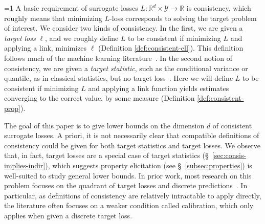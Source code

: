 \documentclass[anon,12pt]{colt2021} %
\newcommand{\Comments}{1}
\newcommand{\mynote}[2]{\ifnum\Comments=1\textcolor{#1}{#2}\fi}
\newcommand{\mytodo}[2]{\ifnum\Comments=1%
	\todo[linecolor=#1!80!black,backgroundcolor=#1,bordercolor=#1!80!black]{#2}\fi}
\newcommand{\jessie}[1]{\mynote{purple}{[JF: #1]}}
\newcommand{\jessiet}[1]{\mytodo{purple!20!white}{JF: #1}}
\newcommand{\bo}[1]{\mynote{blue}{[Bo: #1]}}
\newcommand{\reals}{\mathbb{R}}
\newcommand{\Y}{\mathcal{Y}}
\begin{document}
\jessiet{Make this subsection more concise?}
A basic requirement of surrogate losses $L: \reals^d \times \Y \to \reals$ is consistency, which roughly means that minimizing $L$-loss corresponds to solving the target problem of interest.
We consider two kinds of consistency.
In the first, we are given a \emph{target loss} $\ell$, and we roughly define $L$ to be consistent if minimizing $L$ and applying a link, minimizes $\ell$ (Definition \ref{def:consistent-ell}).
This definition follows much of the machine learning literature~\citep{zhang2004statistical,bartlett2006convexity,tewari2007consistency,steinwart2007compare,ramaswamy2016convex}.
In the second notion of consistency, we are given a \emph{target statistic}, such as the conditional variance or quantile, as in classical statistics, but no target loss~\citep{gyorfi2006distribution, fan1998efficient,ruppert1997local}.
Here we will define $L$ to be consistent if minimizing $L$ and applying a link function yields estimates converging to the correct value, by some measure (Definition \ref{def:consistent-prop}).


The goal of this paper is to give lower bounds on the dimension $d$ of consistent surrogate losses.
A priori, it is not necessarily clear that compatible definitions of consistency could be given for both target statistics and target losses.
We observe that, in fact, target losses are a special case of target statistics (\S~\ref{sec:consis-implies-indir}),
which suggests property elicitation (see \S~\ref{subsec:properties}) is well-suited to study general lower bounds.
In prior work, most research on this problem focuses on the quadrant of target losses and discrete predictions~\citep{zhang2004statistical,bartlett2006convexity,tewari2007consistency,ramaswamy2015hierarchical,ramaswamy2016convex,ramaswamy2018consistent}.
In particular, as definitions of consistency are relatively intractable to apply directly, the literature often focuses on a weaker condition called calibration, which only applies when given a discrete target loss. 
\end{document}
